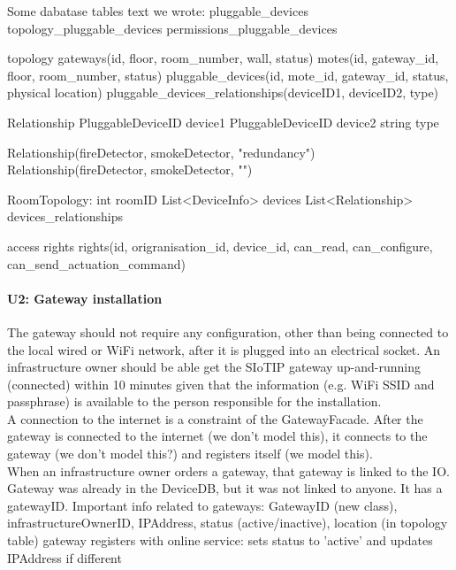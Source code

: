     Some dabatase tables text we wrote:
        pluggable\_devices
        topology\_pluggable\_devices
        permissions\_pluggable\_devices

        topology
            gateways(id, floor, room\_number, wall, status)
            motes(id, gateway\_id, floor, room\_number, status)
            pluggable\_devices(id, mote\_id, gateway\_id, status, physical location)
            pluggable\_devices\_relationships(deviceID1, deviceID2, type)

            Relationship
                PluggableDeviceID device1
                PluggableDeviceID device2
                string type

                Relationship(fireDetector, smokeDetector, "redundancy")
                Relationship(fireDetector, smokeDetector, "\>")

            RoomTopology:
                int roomID
                List<DeviceInfo> devices
                List<Relationship> devices_relationships

        access rights
            rights(id, origranisation\_id, device\_id, can\_read, can\_configure, can\_send\_actuation\_command)

    \paragraph{U2: Gateway installation}
        The gateway should not require any configuration, other than being connected
        to the local wired or WiFi network, after it is plugged into an electrical
        socket. An infrastructure owner should be able get the SIoTIP gateway
        up-and-running (connected) within 10 minutes given that the information
        (e.g. WiFi SSID and passphrase) is available to the person responsible for
        the installation. \\

        A connection to the internet is a constraint of the GatewayFacade.
        After the gateway is connected to the internet (we don't model this),
        it connects to the gateway (we don't model this?) and registers itself (we model this). \\
        When an infrastructure owner orders a gateway, that gateway is linked to the IO.
        Gateway was already in the DeviceDB, but it was not linked to anyone. It has a gatewayID.
        Important info related to gateways: GatewayID (new class), infrastructureOwnerID, IPAddress, status (active/inactive), location (in topology table)
        gateway registers with online service:
            sets status to 'active' and updates IPAddress if different

